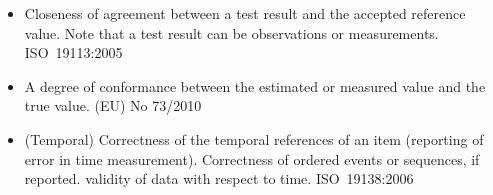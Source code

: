 %
	{\begin{itemize}
	\item Closeness of agreement between a test result and the accepted reference value. Note that a test result can be observations or measurements. ISO\ 19113:2005 \cite{citation:ISO19113} 
	\item A degree of conformance between the estimated or measured value and the true value. (EU) No 73/2010 \cite{citation:EU732010}
	\item (Temporal)  Correctness of the temporal references of an item (reporting of error in time measurement). Correctness of ordered events or sequences, if reported. \Gls{validity} of data with respect to time. ISO\ 19138:2006 \cite{citation:ISO19138}	
	\end{itemize}
}



